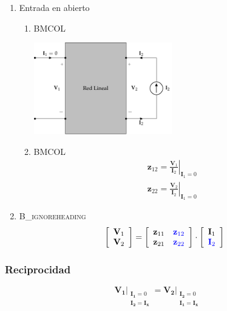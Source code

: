 \begin{enumerate}
\item Entrada en abierto
\label{sec:org16769ae}

\begin{enumerate}
\item \hfill{}\textsc{BMCOL}
\label{sec:org054439f}
\begin{center}
\includegraphics[height=4cm]{../figs/parametrosZ_salida.pdf}
\end{center}

\item \hfill{}\textsc{BMCOL}
\label{sec:orge6ceda7}
\renewcommand{\arraystretch}{2}
\[
  \begin{array}{c}
    \mathbf{z}_{12} = \left.\frac{\mathbf{V}_1}{\mathbf{I}_2}\right\rvert_{\mathbf{I}_1 = 0}\\
    \mathbf{z}_{22} = \left.\frac{\mathbf{V}_2}{\mathbf{I}_2}\right\rvert_{\mathbf{I}_1 = 0}
  \end{array}
\]
\end{enumerate}

\item \hfill{}\textsc{B\_ignoreheading}
\label{sec:org55c3206}
\[
  \left[
    \begin{array}{c}
      \mathbf{V}_1\\
      \mathbf{V}_2
    \end{array}
  \right] =
  \left[
    \begin{array}{cc}
      \mathbf{z}_{11} & \color{blue}{\mathbf{z}_{12}}\\
      \mathbf{z}_{21} & \color{blue}{\mathbf{z}_{22}}
    \end{array}
  \right] \cdot
  \left[
    \begin{array}{c}
      \mathbf{I}_1\\
      \color{blue}{\mathbf{I}_2}
    \end{array}
  \right]
\]
\end{enumerate}

\subsubsection{Reciprocidad}
\label{sec:org827c391}
\[
\left.\mathbf{V_1}\right\rvert_{
  \begin{array}{l}
\mathbf{I_1} = 0\\ \mathbf{I_2} = \mathbf{I_x}
  \end{array}
} =%
\left.\mathbf{V_2}\right\rvert_{
  \begin{array}{l}
\mathbf{I_2} = 0\\ \mathbf{I_1} = \mathbf{I_x}
  \end{array}
}
\]

